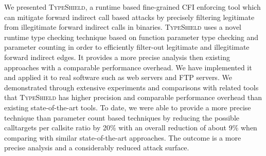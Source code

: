 We presented \textsc{TypeShield}, a runtime based fine-grained CFI enforcing
tool which can mitigate forward indirect call based attacks by
precisely filtering legitimate from illegitimate forward indirect calls in binaries.
\textsc{TypeShield} uses a novel runtime type checking technique based on function parameter
type checking and parameter counting in order to efficiently filter-out legitimate
and illegitimate forward indirect edges.
It provides a more precise analysis then existing approaches with a
comparable performance overhead.
We have implemented it and applied it to real software such as web servers and FTP servers.
We demonstrated through extensive experiments and comparisons with related tools
that \textsc{TypeShield} has higher precision and comparable performance overhead than 
existing state-of-the-art tools. To date, we were able to provide a more precise
technique than parameter count based techniques by reducing the possible calltargets 
per callsite ratio by 20\% with an overall reduction of about 
9\% when comparing with similar state-of-the-art approaches.
The outcome is a more precise analysis and a considerably reduced attack surface.


